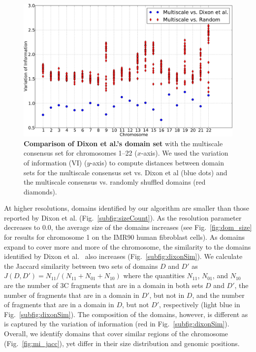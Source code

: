 \documentclass[12pt]{cmuthesis}
\begin{document}
  \begin{figure}[t!]
    \begin{center}
      \includegraphics[width=.9\linewidth]{figures/UsVsBingVI}
    \end{center}
    \caption{\textbf{Comparison of Dixon et al.'s domain set} with the multiscale consensus set for chromosomes 1--22 ($x$-axis). We used the variation of information (VI) ($y$-axis) to compute distances between domain sets for the multiscale consensus set vs. Dixon et al (blue dots) and the multiscale consensus vs. randomly shuffled domains (red diamonds).}
    \label{fig:consensus_agreement}
  \end{figure}

  At higher resolutions, domains identified by our algorithm are smaller than those reported by Dixon et al. (Fig.~\ref{subfig:sizeCount}). As the resolution parameter decreases to 0.0, the average size of the domains increases  (see Fig.~\ref{fig:dom_size} for results for chromosome 1 on the IMR90 human fibroblast cells). As domains expand to cover more and more of the chromosome, the similarity to the domains identified by Dixon et al.~\cite{Dixon2012} also increases (Fig.~\ref{subfig:dixonSim}). We calculate the Jaccard similarity between two sets of domains $D$ and $D'$ as $J(D, D') = N_{11} / (N_{11} + N_{01} + N_{10})$ where the quantities $N_{11}$, $N_{01}$, and $N_{10}$ are the number of 3C fragments that are in a domain in both sets $D$ and $D'$, the number of fragments that are in a domain in $D'$, but not in $D$, and the number of fragments that are in a domain in $D$, but not $D'$, respectively (light blue in Fig.~\ref{subfig:dixonSim}). The composition of the domains, however, is different as is captured by the variation of information (red in Fig.~\ref{subfig:dixonSim}). Overall, we identify domains that cover similar regions of the chromosome (Fig.~\ref{fig:mi_jacc}), yet differ in their size distribution and genomic positions.
\end{document}
